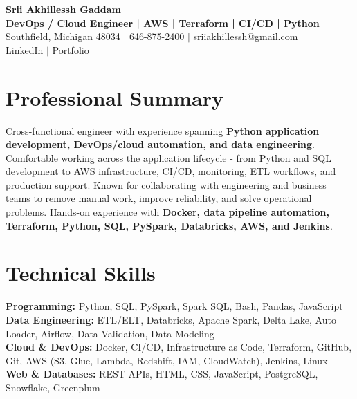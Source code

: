 \documentclass[letterpaper,10pt]{article}
\begin{document}
\fontsize{9.35pt}{10.45pt}\selectfont

\begin{center}
    {\LARGE \textbf{Srii Akhillessh Gaddam}} \\[-1pt]
    \textbf{DevOps / Cloud Engineer | AWS | Terraform | CI/CD | Python} \\[2pt]
    Southfield, Michigan 48034 $|$
    \href{tel:6468752400}{646-875-2400} $|$
    \href{mailto:sriiakhillessh@gmail.com}{sriiakhillessh@gmail.com} \\[1pt]
    \href{https://www.linkedin.com/in/srii-akhiilessh-gaddam-b48668191/}{LinkedIn} $|$
    \href{https://sriiakhillesshg.github.io/portfolio/}{Portfolio}
\end{center}
\vspace{-8pt}

\section{Professional Summary}
\small{Cross-functional engineer with experience spanning \textbf{Python application development, DevOps/cloud automation, and data engineering}. Comfortable working across the application lifecycle - from Python and SQL development to AWS infrastructure, CI/CD, monitoring, ETL workflows, and production support. Known for collaborating with engineering and business teams to remove manual work, improve reliability, and solve operational problems. Hands-on experience with \textbf{Docker, data pipeline automation, Terraform, Python, SQL, PySpark, Databricks, AWS, and Jenkins}.}

\section{Technical Skills}
\small{
\textbf{Programming:} Python, SQL, PySpark, Spark SQL, Bash, Pandas, JavaScript \\
\textbf{Data Engineering:} ETL/ELT, Databricks, Apache Spark, Delta Lake, Auto Loader, Airflow, Data Validation, Data Modeling \\
\textbf{Cloud \& DevOps:} Docker, CI/CD, Infrastructure as Code, Terraform, GitHub, Git, AWS (S3, Glue, Lambda, Redshift, IAM, CloudWatch), Jenkins, Linux \\
\textbf{Web \& Databases:} REST APIs, HTML, CSS, JavaScript, PostgreSQL, Snowflake, Greenplum
}
\end{document}
